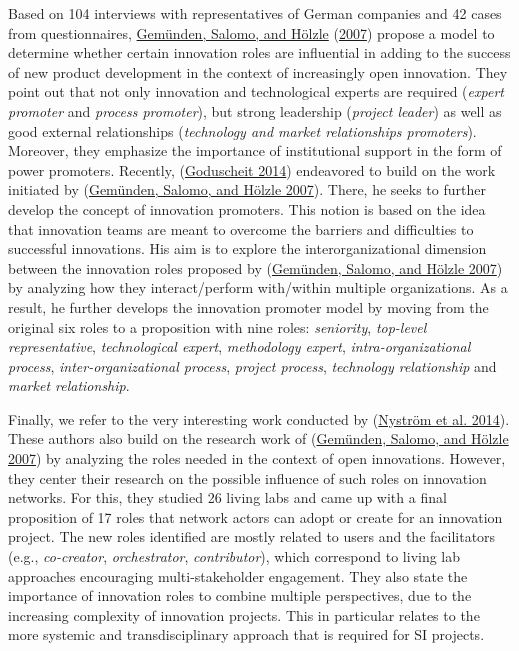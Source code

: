 \documentclass[AMA,STIX1COL,APA,STIX2COL]{WileyNJD-v2}
\begin{document}
Based on 104 interviews with representatives of German companies and 42
cases from questionnaires,
\protect\hyperlink{ref-Gemunden2007}{Gemünden, Salomo, and Hölzle}
(\protect\hyperlink{ref-Gemunden2007}{2007}) propose a model to
determine whether certain innovation roles are influential in adding to
the success of new product development in the context of increasingly
open innovation. They point out that not only innovation and
technological experts are required (\emph{expert promoter} and
\emph{process promoter}), but strong leadership (\emph{project leader})
as well as good external relationships (\emph{technology and market
relationships promoters}). Moreover, they emphasize the importance of
institutional support in the form of power promoters. Recently,
(\protect\hyperlink{ref-Goduscheit2014}{Goduscheit 2014}) endeavored to
build on the work initiated by
(\protect\hyperlink{ref-Gemunden2007}{Gemünden, Salomo, and Hölzle
2007}). There, he seeks to further develop the concept of innovation
promoters. This notion is based on the idea that innovation teams are
meant to overcome the barriers and difficulties to successful
innovations. His aim is to explore the interorganizational dimension
between the innovation roles proposed by
(\protect\hyperlink{ref-Gemunden2007}{Gemünden, Salomo, and Hölzle
2007}) by analyzing how they interact/perform with/within multiple
organizations. As a result, he further develops the innovation promoter
model by moving from the original six roles to a proposition with nine
roles: \emph{seniority}, \emph{top-level representative},
\emph{technological expert}, \emph{methodology expert},
\emph{intra-organizational process}, \emph{inter-organizational
process}, \emph{project process}, \emph{technology relationship} and
\emph{market relationship}.

Finally, we refer to the very interesting work conducted by
(\protect\hyperlink{ref-Nystrom2014}{Nyström et al. 2014}). These
authors also build on the research work of
(\protect\hyperlink{ref-Gemunden2007}{Gemünden, Salomo, and Hölzle
2007}) by analyzing the roles needed in the context of open innovations.
However, they center their research on the possible influence of such
roles on innovation networks. For this, they studied 26 living labs and
came up with a final proposition of 17 roles that network actors can
adopt or create for an innovation project. The new roles identified are
mostly related to users and the facilitators (e.g., \emph{co-creator},
\emph{orchestrator}, \emph{contributor}), which correspond to living lab
approaches encouraging multi-stakeholder engagement. They also state the
importance of innovation roles to combine multiple perspectives, due to
the increasing complexity of innovation projects. This in particular
relates to the more systemic and transdisciplinary approach that is
required for SI projects.
\end{document}

